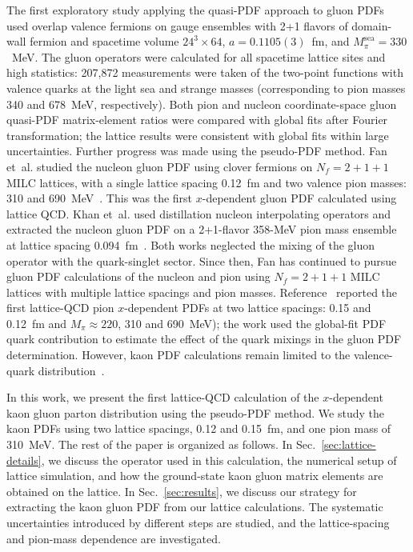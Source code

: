 The first exploratory study applying the quasi-PDF approach to gluon PDFs~\cite{Fan:2018dxu} used overlap valence fermions on gauge ensembles with 2+1 flavors of domain-wall fermion and spacetime volume $24^3\times 64$, $a=0.1105(3)$~fm, and $M_\pi^\text{sea}=330$~MeV.
The gluon operators were calculated for all spacetime lattice sites and high statistics: 207,872 measurements were taken of the two-point functions with valence quarks at the light sea and strange masses (corresponding to pion masses 340 and 678~MeV, respectively).
Both pion and nucleon coordinate-space gluon quasi-PDF matrix-element ratios were compared with global fits after Fourier transformation;
the lattice results were consistent with global fits within large uncertainties.
Further progress was made using the pseudo-PDF method.
Fan et~al. studied the nucleon gluon PDF using clover fermions on $N_f=2+1+1$ MILC lattices, with a single lattice spacing 0.12~fm and two valence pion masses: 310 and 690~MeV~\cite{Fan:2020cpa}.
This was the first $x$-dependent gluon PDF calculated using lattice QCD.
Khan et~al. used distillation nucleon interpolating operators and extracted the nucleon gluon PDF on a 2+1-flavor 358-MeV pion mass ensemble at lattice spacing 0.094~fm~\cite{HadStruc:2021wmh}.
Both works neglected the mixing of the gluon operator with the quark-singlet sector.
Since then, Fan has continued to pursue gluon PDF calculations of the nucleon and pion using $N_f=2+1+1$ MILC lattices with multiple lattice spacings and pion masses.
Reference~\cite{Fan:2021bcr} reported the first lattice-QCD pion $x$-dependent PDFs at two lattice spacings: 0.15 and 0.12~fm and $M_\pi \approx 220$, 310 and 690~MeV);
the work used the global-fit PDF quark contribution to estimate the effect of the quark mixings in the gluon PDF determination.
However, kaon PDF calculations remain limited to the valence-quark distribution~\cite{Lin:2020ssv}.

In this work, we present the first lattice-QCD calculation of the $x$-dependent kaon gluon parton distribution using the pseudo-PDF method.
We study the kaon PDFs using two lattice spacings, 0.12 and 0.15~fm, and  one pion mass of 310~MeV.
The rest of the paper is organized as follows.
In Sec.~\ref{sec:lattice-details}, we discuss the operator used in this calculation, the numerical setup of lattice simulation, and how the ground-state kaon gluon matrix elements are obtained on the lattice.
In Sec.~\ref{sec:results}, we discuss our strategy for extracting the kaon gluon PDF from our lattice calculations.
The systematic uncertainties introduced by different steps are studied, and the lattice-spacing and pion-mass dependence are investigated.
